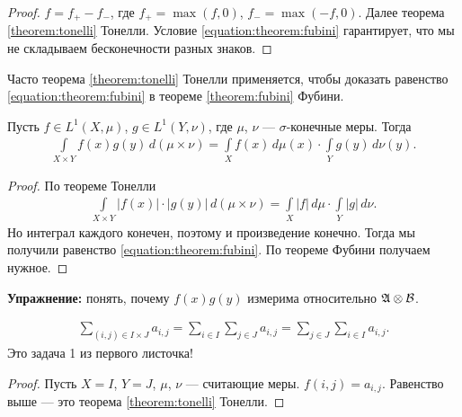 \begin{proof}
 $f = f_+ - f_-$, где $f_+ = \max(f, 0)$, $f_- = \max(-f, 0)$. Далее теорема \ref{theorem:tonelli} Тонелли. Условие \eqref{equation:theorem:fubini} гарантирует, что мы не складываем бесконечности разных знаков.
\end{proof}
\begin{remrk*}
 Часто теорема \ref{theorem:tonelli} Тонелли применяется, чтобы доказать равенство \eqref{equation:theorem:fubini} в теореме \ref{theorem:fubini} Фубини.
\end{remrk*}
\begin{exmpl}
 Пусть $f \in L^{1}(X,\mu)$, $g \in L^{1}(Y,\nu)$, где $\mu$, $\nu$  --- $\sigma$-конечные меры. Тогда \begin{align*}
  \int\limits_{X \times Y} f(x)g(y) \, d(\mu \times \nu) = \int\limits_{X} f(x) \, d\mu (x) \cdot \int\limits_{Y} g(y) \, d\nu(y)   
 .\end{align*} 
\end{exmpl}
\begin{proof}
 По теореме Тонелли \begin{align*}
  \int\limits_{X \times Y} \left| f(x) \right| \cdot \left| g(y) \right| \, d(\mu \times \nu)  = \int\limits_{X} \left| f \right| \, d\mu  \cdot \int\limits_{Y} \left| g \right| \, d\nu  
 .\end{align*} Но интеграл каждого конечен, поэтому и произведение конечно. Тогда мы получили равенство \eqref{equation:theorem:fubini}. По теореме Фубини получаем нужное.
\end{proof}
\textbf{Упражнение:} понять, почему $f(x)g(y)$ измерима относительно $\mathfrak{A} \otimes \mathcal{B}$.
 
\begin{exmpl}
 \begin{align*}
  \sum_{(i,j) \in I \times J} a_{i,j} = \sum_{i \in I} \sum_{j \in J} a_{i,j} = \sum_{j \in J}  \sum_{i \in I}  a_{i,j}
 .\end{align*} Это задача 1 из первого листочка!
\end{exmpl}
\begin{proof}
 Пусть $X = I$, $Y = J$, $\mu$, $\nu$ --- считающие меры. $f(i,j) = a_{i,j}$. Равенство выше --- это теорема \ref{theorem:tonelli} Тонелли.
\end{proof}

